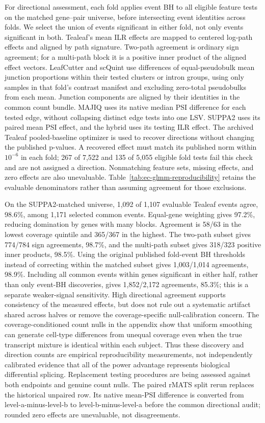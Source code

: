 \documentclass[11pt]{article}
\begin{document}
For directional assessment, each fold applies event BH to all eligible feature tests on the matched gene--pair universe, before intersecting event identities across folds. We select the union of events significant in either fold, not only events significant in both. Tealeaf's mean ILR effects are mapped to centered log-path effects and aligned by path signature. Two-path agreement is ordinary sign agreement; for a multi-path block it is a positive inner product of the aligned effect vectors. LeafCutter and scQuint use differences of equal-pseudobulk mean junction proportions within their tested clusters or intron groups, using only samples in that fold's contrast manifest and excluding zero-total pseudobulks from each mean. Junction components are aligned by their identities in the common count bundle. MAJIQ uses its native median PSI difference for each tested edge, without collapsing distinct edge tests into one LSV. SUPPA2 uses its paired mean PSI effect, and the hybrid uses its testing ILR effect. The archived Tealeaf pooled-baseline optimizer is used to recover directions without changing the published p-values. A recovered effect must match its published norm within \(10^{-6}\) in each fold; 267 of 7,522 and 135 of 5,055 eligible fold tests fail this check and are not assigned a direction. Nonmatching feature sets, missing effects, and zero effects are also unevaluable. Table~\ref{tab:ec-glmm-reproducibility} retains the evaluable denominators rather than assuming agreement for those exclusions.

On the SUPPA2-matched universe, 1,092 of 1,107 evaluable Tealeaf events agree, 98.6\%, among 1,171 selected common events. Equal-gene weighting gives 97.2\%, reducing domination by genes with many blocks. Agreement is 58/63 in the lowest coverage quintile and 365/367 in the highest. The two-path subset gives 774/784 sign agreements, 98.7\%, and the multi-path subset gives 318/323 positive inner products, 98.5\%. Using the original published fold-event BH thresholds instead of correcting within the matched subset gives 1,003/1,014 agreements, 98.9\%. Including all common events within genes significant in either half, rather than only event-BH discoveries, gives 1,852/2,172 agreements, 85.3\%; this is a separate weaker-signal sensitivity. High directional agreement supports consistency of the measured effects, but does not rule out a systematic artifact shared across halves or remove the coverage-specific null-calibration concern. The coverage-conditioned count nulls in the appendix show that uniform smoothing can generate cell-type differences from unequal coverage even when the true transcript mixture is identical within each subject. Thus these discovery and direction counts are empirical reproducibility measurements, not independently calibrated evidence that all of the power advantage represents biological differential splicing. Replacement testing procedures are being assessed against both endpoints and genuine count nulls. The paired rMATS split rerun replaces the historical unpaired row. Its native mean-PSI difference is converted from level-a-minus-level-b to level-b-minus-level-a before the common directional audit; rounded zero effects are unevaluable, not disagreements.
\end{document}
